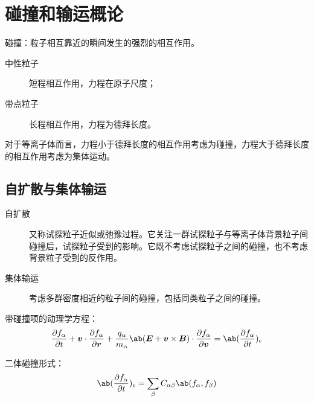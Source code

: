 
\chapter{碰撞和输运概论}

碰撞：粒子相互靠近的瞬间发生的强烈的相互作用。
\begin{description}
    \item[中性粒子] 短程相互作用，力程在原子尺度；
    \item[带点粒子] 长程相互作用，力程为德拜长度。
\end{description}

对于等离子体而言，力程小于德拜长度的相互作用考虑为碰撞，力程大于德拜长度的相互作用考虑为集体运动。

\section{自扩散与集体输运}

\begin{description}
    \item[自扩散] 又称试探粒子近似或弛豫过程。它关注一群试探粒子与等离子体背景粒子间碰撞后，试探粒子受到的影响。它既不考虑试探粒子之间的碰撞，也不考虑背景粒子受到的反作用。
    \item[集体输运] 考虑多群密度相近的粒子间的碰撞，包括同类粒子之间的碰撞。
\end{description}

带碰撞项的动理学方程：
\begin{equation}
\pdv{f_\alpha}{t}
+ \vector{v} \cdot \pdv{f_\alpha}{\vector{r}}
+ \frac{q_\alpha}{m_\alpha} \ab(
    \vector{E} + \vector{v} \times \vector{B}
) \cdot \pdv{f_\alpha}{\vector{v}}
= \ab(\pdv{f_\alpha}{t})_c
\end{equation}

二体碰撞形式：
\begin{equation}
\ab(\pdv{f_\alpha}{t})_c = \sum_\beta C_{\alpha\beta} \ab(f_\alpha, f_\beta)
\end{equation}


